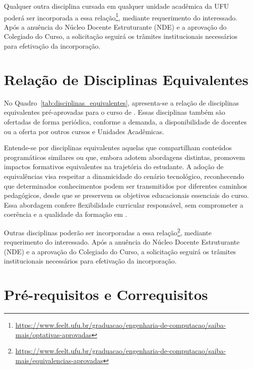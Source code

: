 

Qualquer outra disciplina cursada em qualquer unidade acadêmica da UFU poderá ser incorporada a essa relação\footnote{\url{https://www.feelt.ufu.br/graduacao/engenharia-de-computacao/saiba-mais/optativas-aprovadas}}, mediante requerimento do interessado. Após a anuência do Núcleo Docente Estruturante (NDE) e a aprovação do Colegiado do Curso, a solicitação seguirá os trâmites institucionais necessários para efetivação da incorporação.

\section{Relação de Disciplinas Equivalentes}
\label{sec:equivalentes}

No Quadro~\ref{tab:disciplinas_equivalentes}, apresenta-se a relação de disciplinas equivalentes pré-aprovadas para o curso de \ppccurso. Essas disciplinas também são ofertadas de forma periódica, conforme a demanda, a disponibilidade de docentes ou a oferta por outros cursos e Unidades Acadêmicas.

Entende-se por disciplinas equivalentes aquelas que compartilham conteúdos programáticos similares ou que, embora adotem abordagens distintas, promovem impactos formativos equivalentes na trajetória do estudante. A adoção de equivalências visa respeitar a dinamicidade do cenário tecnológico, reconhecendo que determinados conhecimentos podem ser transmitidos por diferentes caminhos pedagógicos, desde que se preservem os objetivos educacionais essenciais do curso. Essa abordagem confere flexibilidade curricular responsável, sem comprometer a coerência e a qualidade da formação em \ppccurso.


Outras disciplinas poderão ser incorporadas a essa relação\footnote{\url{https://www.feelt.ufu.br/graduacao/engenharia-de-computacao/saiba-mais/equivalencias-aprovadas}}, mediante requerimento do interessado. Após a anuência do Núcleo Docente Estruturante (NDE) e a aprovação do Colegiado do Curso, a solicitação seguirá os trâmites institucionais necessários para efetivação da incorporação.

\section{Pré-requisitos e Correquisitos}


